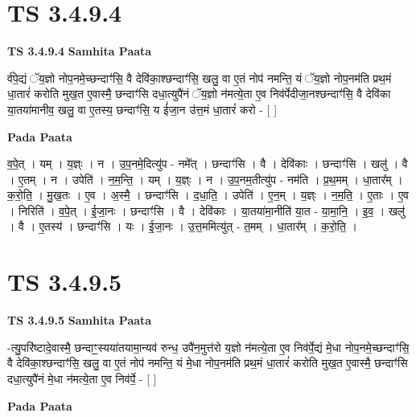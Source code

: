 \documentclass[17pt]{extarticle}
\begin{document}
\section*{ TS 3.4.9.4 }

\textbf{TS 3.4.9.4 } \newline
\textbf{Samhita Paata} \newline

र्व॑पे॒द्यं ॅय॒ज्ञो नोप॒नमे॒च्छन्दाꣳ॑सि॒ वै देवि॑का॒श्छन्दाꣳ॑सि॒ खलु॒ वा ए॒तं नोप॑ नमन्ति॒ यं ॅय॒ज्ञो नोप॒नम॑ति प्रथ॒मं धा॒तारं॑ करोति मुख॒त ए॒वास्मै॒ छन्दाꣳ॑सि दधा॒त्युपै॑नं ॅय॒ज्ञो न॑मत्ये॒ता ए॒व निव॑र्पेदीजा॒नश्छन्दाꣳ॑सि॒ वै देवि॑का या॒तया॑मानीव॒ खलु॒ वा ए॒तस्य॒ छन्दाꣳ॑सि॒ य ई॑जा॒न उ॑त्त॒मं धा॒तारं॑ करो - [  ] \newline

\textbf{Pada Paata} \newline

व॒पे॒त् । यम् । य॒ज्ञ्ः । न । उ॒प॒नमे॒दित्यु॑प - नमे᳚त् । छन्दाꣳ॑सि । वै । देवि॑काः । छन्दाꣳ॑सि । खलु॑ । वै । ए॒तम् । न । उपेति॑ । न॒म॒न्ति॒ । यम् । य॒ज्ञ्ः । न । उ॒प॒नम॒तीत्यु॑प - नम॑ति । प्र॒थ॒मम् । धा॒तार᳚म् । क॒रो॒ति॒ । मु॒ख॒तः । ए॒व । अ॒स्मै॒ । छन्दाꣳ॑सि । द॒धा॒ति॒ । उपेति॑ । ए॒न॒म् । य॒ज्ञ्ः । न॒म॒ति॒ । ए॒ताः । ए॒व । निरिति॑ । व॒पे॒त् । ई॒जा॒नः । छन्दाꣳ॑सि । वै । देवि॑काः । या॒तया॑मा॒नीति॑ या॒त - या॒मा॒नि॒ । इ॒व॒ । खलु॑ । वै । ए॒तस्य॑ । छन्दाꣳ॑सि । यः । ई॒जा॒नः । उ॒त्त॒ममित्यु॑त् - त॒मम् । धा॒तार᳚म् । क॒रो॒ति॒ ।  \newline




\section*{ TS 3.4.9.5 }

\textbf{TS 3.4.9.5 } \newline
\textbf{Samhita Paata} \newline

-त्यु॒परि॑ष्टादे॒वास्मै॒ छन्दाꣳ॒॒स्यया॑तयामा॒न्यव॑ रुन्ध॒ उपै॑न॒मुत्त॑रो य॒ज्ञो न॑मत्ये॒ता ए॒व निव॑र्पे॒द्यं मे॒धा नोप॒नमे॒च्छन्दाꣳ॑सि॒ वै देवि॑का॒श्छन्दाꣳ॑सि॒ खलु॒ वा ए॒तं नोप॑ नमन्ति॒ यं मे॒धा नोप॒नम॑ति प्रथ॒मं धा॒तारं॑ करोति मुख॒त ए॒वास्मै॒ छन्दाꣳ॑सि दधा॒त्युपै॑नं मे॒धा न॑मत्ये॒ता ए॒व निव॑र्पे॒ - [  ] \newline

\textbf{Pada Paata} \newline
\end{document}

